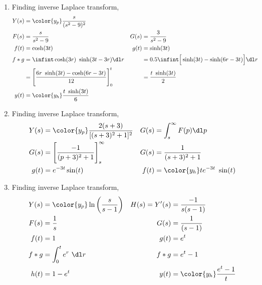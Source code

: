 \begin{enumerate}
    \item Finding inverse Laplace transform,
          \begin{align}
              Y(s) & = \color{y_p} \frac{s}{(s^2 - 9)^2}                             \\
              F(s) & = \frac{s}{s^2 - 9}                                           &
              G(s) & = \frac{3}{s^2 - 9}                                             \\
              f(t) & = \cosh(3t)                                                   &
              g(t) & = \sinh(3t)                                                     \\
              f*g  & = \infint \cosh(3r)\ \sinh(3t - 3r) \dl r                     &
                   & = 0.5 \infint \Big[\sinh(3t) - \sinh(6r - 3t)\Big] \dl r        \\
                   & = \Bigg[ \frac{6r\ \sinh(3t) - \cosh(6r - 3t)}{12} \Bigg]_0^t &
                   & = \frac{t\ \sinh(3t)}{2}                                        \\
              y(t) & = \color{y_h} \frac{t\ \sinh(3t)}{6}
          \end{align}

    \item Finding inverse Laplace transform,
          \begin{align}
              Y(s) & = \color{y_p} \frac{2(s + 3)}{[(s+3)^2 + 1]^2}   &
              G(s) & = \int_{s}^{\infty} F(p) \dl p                     \\
              G(s) & =  \Bigg[ \frac{-1}{(p+3)^2 + 1} \Bigg]_s^\infty &
              G(s) & = \frac{1}{(s+3)^2 + 1}                            \\
              g(t) & = e^{-3t}\sin(t)                                 &
              f(t) & = \color{y_h} t e^{-3t}\ \sin(t)
          \end{align}

    \item Finding inverse Laplace transform,
          \begin{align}
              Y(s)         & = \color{y_p} \ln\left( \frac{s}{s-1} \right) &
              H(s) = Y'(s) & = \frac{-1}{s(s-1)}                             \\
              F(s)         & = \frac{1}{s}                                 &
              G(s)         & = \frac{1}{(s-1)}                               \\
              f(t)         & = 1                                           &
              g(t)         & = e^{t}                                         \\
              f * g        & = \int_{0}^{t} e^r\ \dl r                     &
              f * g        & = e^t - 1                                       \\
              h(t)         & = 1 - e^t                                     &
              y(t)         & = \color{y_h} \frac{e^t - 1}{t}
          \end{align}


\end{enumerate}

